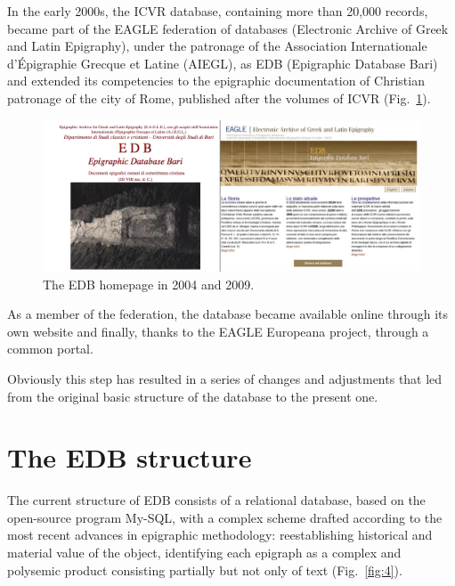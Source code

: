 \documentclass[amsthm,ebook]{saparticle}
\begin{document}
In the early 2000s, the ICVR database, containing more than 20,000 records, became part of the EAGLE federation of
databases (Electronic Archive of Greek and Latin Epigraphy), under the patronage of the Association Internationale
d’Épigraphie Grecque et Latine (AIEGL), as EDB (Epigraphic Database Bari) and extended its competencies to the
epigraphic documentation of Christian patronage of the city of Rome, published after the volumes of ICVR (Fig.~\ref{fig:3}). 

\begin{figure}[hbp]
\centering
 \includegraphics[width=\columnwidth]{EAGLE2016Roccoengrev-img003.png} 
\caption{The EDB homepage in 2004 and 2009.}
\label{fig:3}
\end{figure}



As a member of the federation, the database became available online through its own website and finally, thanks to the
EAGLE Europeana project, through a common portal.

Obviously this step has resulted in a series of changes and adjustments that led from the original basic structure of
the database to the present one. 

\section{The EDB structure}


The current structure of EDB consists of a relational database, based on the open-source program My-SQL, with a complex
scheme drafted according to the most recent advances in epigraphic methodology: reestablishing historical and material
value of the object, identifying each epigraph as a complex and polysemic product consisting partially but not only of
text (Fig.~\ref{fig:4}).
\end{document}
